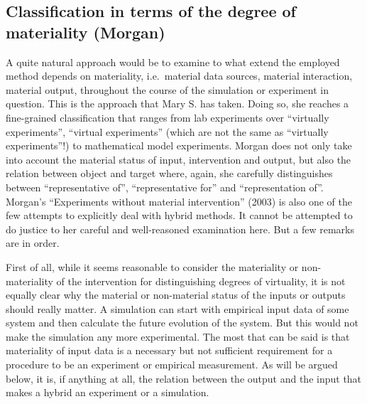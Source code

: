 \documentclass[12pt, a4paper]{article}
\numberwithin{equation}{section}
\begin{document}
\subsection{Classification in terms of the degree of materiality (Morgan)}

A quite natural approach would be to examine to what extend the employed method depends on materiality, i.e.\ material data sources, material interaction, material output, throughout the course of the simulation or experiment in question. This is the approach that Mary S. \citet{morgan:2003} has taken. Doing so, she reaches a fine-grained classification that ranges from lab experiments over ``virtually experiments'', ``virtual experiments'' (which are not the same as ``virtually experiments''!) to mathematical model experiments. Morgan does not only take into account the material status of input, intervention and output, but also the relation between object and target where, again, she carefully distinguishes between ``representative of'', ``representative for'' and ``representation of''. Morgan's ``Experiments without material intervention'' (2003) is also one of the few attempts to explicitly deal with hybrid methods. It cannot be attempted to do justice to her careful and well-reasoned examination here. But a few remarks are in order.

First of all, while it seems reasonable to consider the materiality or non-materiality of the intervention for distinguishing degrees of virtuality, it is not equally clear why the material or non-material status of the inputs or outputs should really matter. A simulation can start with empirical input data of some system and then calculate the future evolution of the system. But this would not make the simulation any more experimental. The most that can be said is that materiality of input data is a necessary but not sufficient requirement for a procedure to be an experiment or empirical measurement. As will be argued below, it is, if anything at all, the relation between the output and the input that makes a hybrid an experiment or a simulation. 
\end{document}
